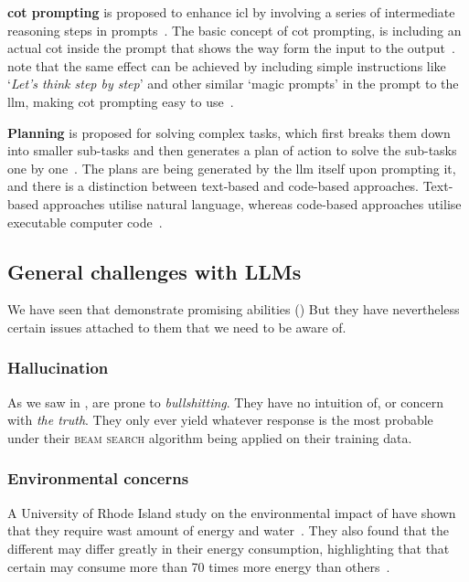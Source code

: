 \textbf{\acrfull{cot} prompting} is proposed to enhance \acrlong{icl} by involving a
series of intermediate reasoning steps in prompts~\cite[44, 52]{llmSurvey}. The basic concept of
\acrshort{cot} prompting, is including an actual \acrlong{cot} inside the prompt that shows the way
form the input to the output~\cite[52]{llmSurvey}.~\citeauthor{llmSurvey} note that the same effect
can be achieved by including simple instructions like `\textit{Let's think step by step}' and other
similar `magic prompts' in the prompt to the \acrshort{llm}, making \acrshort{cot} prompting easy to
use~\cite[52]{llmSurvey}.

\textbf{Planning} is proposed for solving complex tasks, which first breaks them down into smaller
sub-tasks and then generates a plan of action to solve the sub-tasks one by
one~\cite[44, 54]{llmSurvey}. The plans are being generated by the \acrshort{llm} itself upon
prompting it, and there is a distinction between text-based and code-based approaches. Text-based
approaches utilise natural language, whereas code-based approaches utilise executable computer code~\cite[54-55]{llmSurvey}.


\subsection{General challenges with LLMs}\label{sec:llmProblems}

We have seen that  demonstrate promising abilities () But they have nevertheless certain issues attached to them that we need to be aware of.

\subsubsection{Hallucination}\label{sec:llmHallucination}

As we saw in ,  are prone to
\textit{bullshitting}. They have no intuition of, or concern with \textit{the
    truth}. They only ever yield whatever response is the most probable under their
\textsc{beam search} algorithm being applied on their training data.

\subsubsection{Environmental concerns}

A University of Rhode Island study on the environmental impact of  have shown that
they require wast amount of energy and water~\cite{hungryLlm}. They also found that the different
 may differ greatly in their energy consumption, highlighting that that certain
 may consume more than \num{70} times more energy than others~\cite{hungryLlm}.

